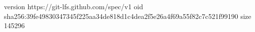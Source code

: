 version https://git-lfs.github.com/spec/v1
oid sha256:39fe49830347345f225aa34de818d1c4dea2f5e26a4f69a55f82c7c521f99190
size 145296
